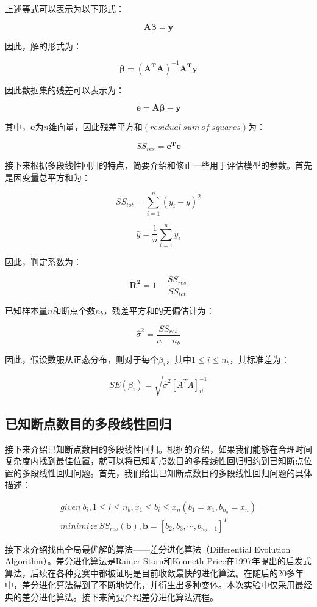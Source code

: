 上述等式可以表示为以下形式\cite{ref7}：

\[\mathbf{A\beta} = \mathbf{y}\]

因此，解的形式为：

\[\mathbf{\beta} = (\mathbf{A^T}\mathbf{A})^{-1}\mathbf{A^T}\mathbf{y}\]

因此数据集的残差可以表示为：

\[\mathbf{e}=\mathbf{A\beta} -\mathbf{y}\]

其中，$\mathbf{e}$为$n$维向量，因此残差平方和$(residual~sum~of~squares)$为：

\[SS_{res} = \mathbf{e^Te}\]

接下来根据多段线性回归的特点，简要介绍和修正一些用于评估模型的参数。首先是因变量总平方和为：

\[SS_{tot} = \sum\limits _{i=1}^{n}(y_i - \bar{y})^2\]

\[\bar{y} = \frac{1}{n}\sum\limits _{i=1}^{n}y_i\]

因此，判定系数为：

\[\mathbf{R^2}=1-\frac{SS_{res}}{SS_{tot}}\]

已知样本量$n$和断点个数$n_b$，残差平方和的无偏估计为：

\[\hat{\sigma}^2=\frac{SS_{res}}{n-n_b}\]

因此，假设数服从正态分布，则对于每个$\beta _i$，其中$1 \leq i \leq n_b$，其标准差为：

\[SE(\beta_i)=\sqrt{\hat{\sigma}^2[A^TA]_{ii}^{-1}}\]

\subsection{已知断点数目的多段线性回归\label{p2}}

接下来介绍已知断点数目的多段线性回归。根据的介绍，如果我们能够在合理时间复杂度内找到最佳位置，就可以将已知断点数目的多段线性回归归约到已知断点位置的多段线性回归问题。首先，我们给出已知断点数目的多段线性回归问题的具体描述：

\[\begin{aligned}
given~b_i,1 \leq i \leq n_b,x_1 \leq b_i \leq x_n(b_1=x_1,b_{n_b} = x_n)
\\
minimize~SS_{res}(\mathbf{b}),\mathbf{b}=[b_2,b_3,\cdots,b_{n_b-1}]^T
\end{aligned}\]

接下来介绍找出全局最优解的算法——差分进化算法\cite{ref1}（Differential Evolution Algorithm）。差分进化算法是Rainer Storn和Kenneth Price在1997年提出的启发式算法，后续在各种竞赛中都被证明是目前收敛最快的进化算法。在随后的20多年中，差分进化算法得到了不断地优化，并衍生出多种变体。本次实验中仅采用最经典的差分进化算法。接下来简要介绍差分进化算法流程。

